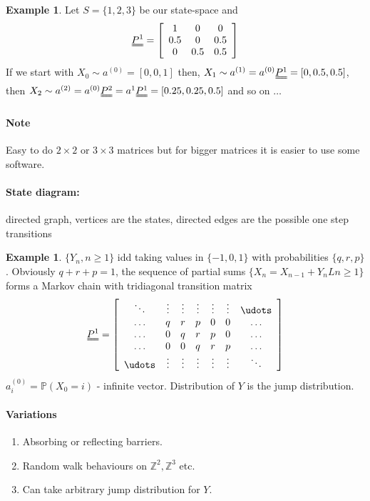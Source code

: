 \documentclass{article}
\theoremstyle{definition}
\newtheorem{ex}[thm]{Example}
\begin{document}
\begin{ex} Let $S = \{1, 2, 3\}$ be our state-space and
\[
\uuline{P^{1}} =  \left [ \begin{array}{ccc}
1 & 0 & 0\\ 0.5 & 0 & 0.5\\ 0 & 0.5 & 0.5 \end{array} \right ]
\]
If we start with $X_0 \sim a^{(0)} = [ 0,0,1 ]$ then, $X_1 \sim a^{(1)} = a^{(0)} \uuline{P^{1}} = [0,0.5,0.5]$, then $X_2 \sim a^{(2)} = a^{(0)} \uuline{P^{2}} = a^{1}\uuline{P^1} = [ 0.25, 0.25, 0.5 ]$ and so on $\ldots$
\end{ex}

\paragraph*{Note} Easy to do $2\times2$ or $3\times3$ matrices but for bigger matrices it is easier to use some software.

\paragraph*{State diagram:} directed graph, vertices are the states, directed edges are the possible one step transitions

\begin{ex} $\{Y_n, n \geq 1 \}$ idd taking values in $\{-1, 0, 1\}$ with probabilities $\{q, r, p\}$. Obviously $q + r + p = 1$, the sequence of partial sums $\{X_n = X_{n-1} + Y_n L n \geq 1\}$ forms a Markov chain with tridiagonal transition matrix
\[
\uuline{P^1} = \left [ \begin{array}{ccccccc}
\ddots & \vdots & \vdots & \vdots & \vdots & \vdots & \udots\\
\hdots & q & r & p & 0 & 0 & \hdots\\
\hdots & 0 & q & r & p & 0 & \hdots\\
\hdots & 0 & 0 & q & r & p & \hdots\\
\udots & \vdots & \vdots & \vdots & \vdots & \vdots & \ddots\\
\end{array} \right ]
\]
$a_i^{(0)} = \mathbb{P}(X_0 = i)$ - infinite vector. Distribution of $Y$ is the jump distribution.
\end{ex}

\paragraph*{Variations}
\begin{enumerate}
\item
Absorbing or reflecting barriers.
\item
Random walk behaviours on $\mathbb{Z}^2, \mathbb{Z}^3$ etc.
\item
Can take arbitrary jump distribution for $Y$.
\end{enumerate}
\end{document}
